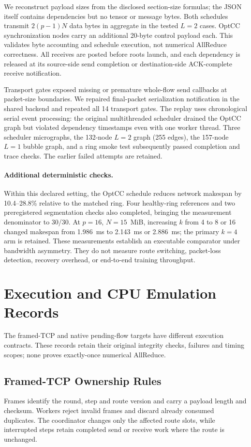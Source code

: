 \documentclass[sigconf]{acmart}
\begin{document}
We reconstruct payload sizes from the disclosed section-size formulas;
the JSON itself contains dependencies but no tensor or message bytes.
Both schedules transmit $2(p-1)N$ data bytes in aggregate in the tested
$L=2$ cases. OptCC synchronization nodes carry an additional 20-byte
control payload each. This validates byte accounting and schedule
execution, not numerical AllReduce correctness. All receives are posted
before roots launch, and each dependency is released at its source-side
send completion or destination-side ACK-complete receive notification.

Transport gates exposed missing or premature whole-flow send callbacks
at packet-size boundaries. We repaired final-packet serialization
notification in the shared backend and repeated all 14 transport gates.
The replay uses chronological serial event processing: the original
multithreaded scheduler drained the OptCC graph but violated dependency
timestamps even with one worker thread. Three scheduler micrographs,
the 132-node $L=2$ graph (255 edges), the 157-node $L=1$ bubble graph,
and a ring smoke test subsequently passed completion and trace checks.
The earlier failed attempts are retained.

\paragraph{Additional deterministic checks.}
Within this declared setting, the OptCC schedule reduces network
makespan by 10.4--28.8\% relative to the matched ring. Four healthy-ring
references and two preregistered segmentation checks also completed,
bringing the measurement denominator to 30/30. At $p=16$, $N=15$~MiB,
increasing $k$ from 4 to 8 or 16 changed makespan from 1.986~ms to
2.143~ms or 2.886~ms; the primary $k=4$ arm is retained. These measurements
establish an executable comparator under bandwidth asymmetry. They do
not measure route switching, packet-loss detection, recovery overhead,
or end-to-end training throughput.

\section{Execution and CPU Emulation Records}
\label{app:execution}
The framed-TCP and native pending-flow targets have different execution
contracts. These records retain their original integrity checks, failures
and timing scopes; none proves exactly-once numerical AllReduce.

\subsection{Framed-TCP Ownership Rules}
Frames identify the round, step and route version and carry a payload
length and checksum. Workers reject invalid frames and discard already
consumed duplicates. The coordinator changes only the affected route
slots, while interrupted steps retain completed send or receive work
where the route is unchanged.
\end{document}
